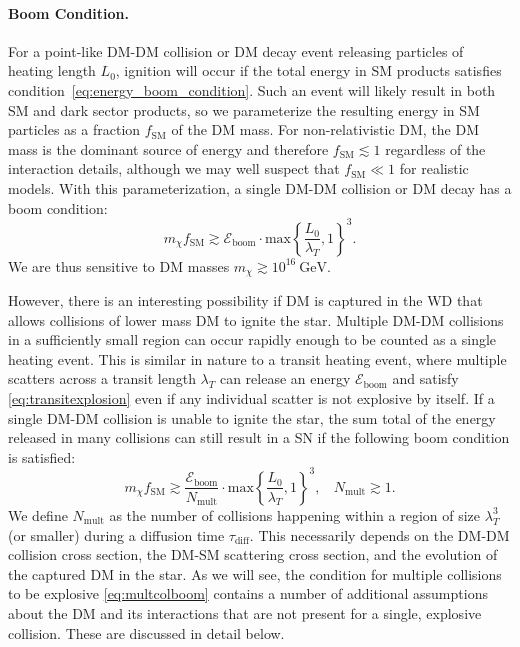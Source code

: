 \documentclass[preprintnumbers,amsmath,amssymb,prd,superscriptaddress]{revtex4}
\newcommand{\Eboom}{\mathcal{E}_\text{boom}}
\newcommand{\GeV}{\text{GeV}}
\begin{document}
\paragraph{Boom Condition.}
For a point-like DM-DM collision or DM decay event releasing particles of heating length $L_0$, ignition will occur if the total energy in SM products satisfies condition~\eqref{eq:energy_boom_condition}.
Such an event will likely result in both SM and dark sector products, so we parameterize the resulting energy in SM particles as a fraction $f_\text{SM}$ of the DM mass.
For non-relativistic DM, the DM mass is the dominant source of energy and therefore $f_\text{SM} \lesssim 1$ regardless of the interaction details, although we may well suspect that $f_\text{SM} \ll 1$ for realistic models.
With this parameterization, a single DM-DM collision or DM decay has a boom condition:
\begin{equation}
\label{eq:coldecay}
  m_\chi f_\text{SM}  \gtrsim \Eboom \cdot \text{max} \left \{\frac{L_0}{\lambda_T}, 1 \right \}^3.
\end{equation}
We are thus sensitive to DM masses $m_\chi \gtrsim 10^{16} ~\GeV$.

However, there is an interesting possibility if DM is captured in the WD that allows collisions of lower mass DM to ignite the star. 
Multiple DM-DM collisions in a sufficiently small region can occur rapidly enough to be counted as a single heating event.
This is similar in nature to a transit heating event, where multiple scatters across a transit length $\lambda_T$ can release an energy $\Eboom$ and satisfy \eqref{eq:transitexplosion} even if any individual scatter is not explosive by itself.   
If a single DM-DM collision is unable to ignite the star, the sum total of the energy released in many collisions can still result in a SN if the following boom condition is satisfied:
\begin{equation}
\label{eq:multcolboom}
 m_\chi f_\text{SM}  \gtrsim \frac{\Eboom}{N_\text{mult}} \cdot \text{max} \left \{\frac{L_0}{\lambda_T}, 1 \right \}^3, ~~~~ N_\text{mult} \gtrsim 1. 
\end{equation}
We define $N_\text{mult}$ as the number of collisions happening within a region of size $\lambda_T^3$ (or smaller) during a diffusion time $\tau_\text{diff}$.
This necessarily depends on the DM-DM collision cross section, the DM-SM scattering cross section, and the evolution of the captured DM in the star. 
As we will see, the condition for multiple collisions to be explosive \eqref{eq:multcolboom} contains a number of additional assumptions about the DM and its interactions that are not present for a single, explosive collision. 
These are discussed in detail below. 
\end{document}

